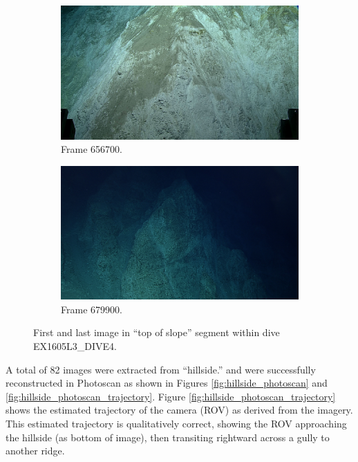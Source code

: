 \documentclass[letterpaper,12pt]{article}
\begin{document}
\begin{figure}[p]
    \centering
    \begin{subfigure}[b]{0.48\textwidth}
        \includegraphics[width=\textwidth]{images/image_656700.png}
        \caption{Frame 656700.}
        \label{fig:ex1605l3_dive4_top_of_slope_begin}
    \end{subfigure}
    \begin{subfigure}[b]{0.48\textwidth}
        \includegraphics[width=\textwidth]{images/image_679900.png}
        \caption{Frame 679900.}
        \label{fig:ex1605l3_dive4_top_of_slope_end}
    \end{subfigure}
    \caption{First and last image in ``top of slope'' segment within dive EX1605L3\_DIVE4.}
\end{figure}

A total of 82 images were extracted from ``hillside.'' and were successfully reconstructed in Photoscan as shown in Figures \ref{fig:hillside_photoscan} and \ref{fig:hillside_photoscan_trajectory}.  Figure \ref{fig:hillside_photoscan_trajectory} shows the estimated trajectory of the camera (ROV) as derived from the imagery.  This estimated trajectory is qualitatively correct, showing the ROV approaching the hillside (as bottom of image), then transiting rightward across a gully to another ridge.   
\end{document}

